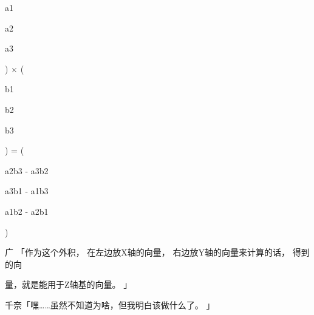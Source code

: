 a1\par
a2\par
a3\par
) $\times$ (\par
b1\par
b2\par
b3\par
) = (\par
a2b3 - a3b2\par
a3b1 - a1b3\par
a1b2 - a2b1\par
)\par
广 「作为这个外积， 在左边放X轴的向量， 右边放Y轴的向量来计算的话， 得到的向\par
量，就是能用于Z轴基的向量。 」\par
千奈「嘿……虽然不知道为啥，但我明白该做什么了。 」\par

